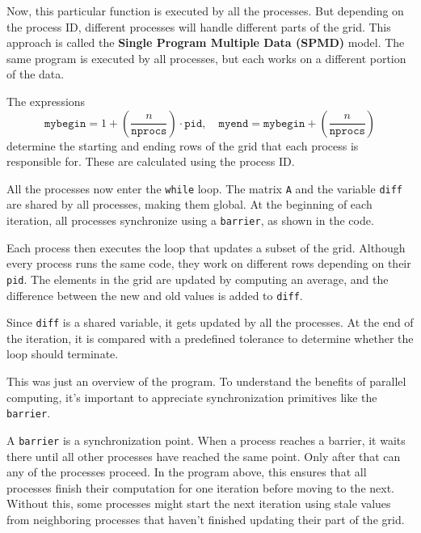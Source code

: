 \documentclass[12pt]{book}
\begin{document}
Now, this particular function is executed by all the processes. But depending on the process ID, different processes will handle different parts of the grid. This approach is called the \textbf{Single Program Multiple Data (SPMD)} model. The same program is executed by all processes, but each works on a different portion of the data.

The expressions 
\[
\texttt{mybegin} = 1 + \left(\frac{n}{\texttt{nprocs}}\right) \cdot \texttt{pid}, \quad \texttt{myend} = \texttt{mybegin} + \left(\frac{n}{\texttt{nprocs}}\right)
\]
determine the starting and ending rows of the grid that each process is responsible for. These are calculated using the process ID.

All the processes now enter the \texttt{while} loop. The matrix \texttt{A} and the variable \texttt{diff} are shared by all processes, making them global. At the beginning of each iteration, all processes synchronize using a \texttt{barrier}, as shown in the code.

Each process then executes the loop that updates a subset of the grid. Although every process runs the same code, they work on different rows depending on their \texttt{pid}. The elements in the grid are updated by computing an average, and the difference between the new and old values is added to \texttt{diff}.

Since \texttt{diff} is a shared variable, it gets updated by all the processes. At the end of the iteration, it is compared with a predefined tolerance to determine whether the loop should terminate.

This was just an overview of the program. To understand the benefits of parallel computing, it's important to appreciate synchronization primitives like the \texttt{barrier}.

A \texttt{barrier} is a synchronization point. When a process reaches a barrier, it waits there until all other processes have reached the same point. Only after that can any of the processes proceed. In the program above, this ensures that all processes finish their computation for one iteration before moving to the next. Without this, some processes might start the next iteration using stale values from neighboring processes that haven’t finished updating their part of the grid.
\end{document}
